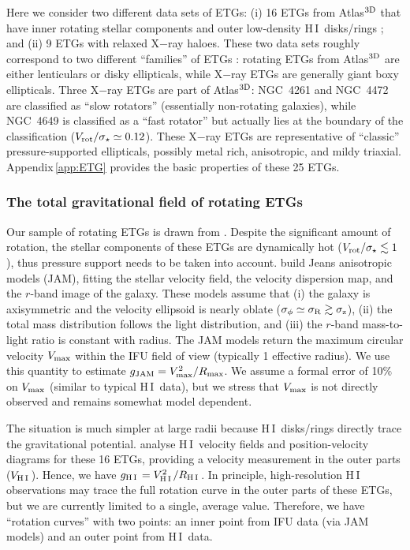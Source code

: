 \documentclass[apjl, twocolappendix]{emulateapj}
\newcommand{\hi } {{\rm H}\,{\small\rm I} \,}
\begin{document}
Here we consider two different data sets of ETGs: (i) 16 ETGs from Atlas$^{\rm 3D}$ \citep{Cappellari2011} that have inner rotating stellar components \citep{Emsellem2011} and outer low-density \hi disks/rings \citep{denHeijer2015}; and (ii) 9 ETGs with relaxed X$-$ray haloes. These two data sets roughly correspond to two different ``families'' of ETGs \citep[e.g.,][]{Kormendy1996, Kormendy2009, Cappellari2016}: rotating ETGs from Atlas$^{\rm 3D}$ are either lenticulars or disky ellipticals, while X$-$ray ETGs are generally giant boxy ellipticals. Three X$-$ray ETGs are part of Atlas$^{\rm 3D}$: NGC~4261 and NGC~4472 are classified as ``slow rotators'' (essentially non-rotating galaxies), while NGC~4649 is classified as a ``fast rotator'' but actually lies at the boundary of the classification ($V_{\rm rot}/\sigma_{\star}\simeq 0.12$). These X$-$ray ETGs are representative of ``classic'' pressure-supported ellipticals, possibly metal rich, anisotropic, and mildy triaxial. Appendix\,\ref{app:ETG} provides the basic properties of these 25 ETGs.

\subsubsection{The total gravitational field of rotating ETGs}\label{sec:rotETGs}

Our sample of rotating ETGs is drawn from \citet{Serra2016}. Despite the significant amount of rotation, the stellar components of these ETGs are dynamically hot ($V_{\rm rot}/\sigma_{\star} \lesssim 1$), thus pressure support needs to be taken into account. \citet{Cappellari2013} build Jeans anisotropic models (JAM), fitting the stellar velocity field, the velocity dispersion map, and the $r$-band image of the galaxy. These models assume that (i) the galaxy is axisymmetric and the velocity ellipsoid is nearly oblate ($\sigma_{\phi}\simeq\sigma_{\rm R}\gtrsim\sigma_{\rm z}$), (ii) the total mass distribution follows the light distribution, and (iii) the $r$-band mass-to-light ratio is constant with radius. The JAM models return the maximum circular velocity $V_{\rm max}$ within the IFU field of view (typically 1 effective radius). We use this quantity to estimate $g_{\rm JAM} = V_{\rm max}^2/R_{\rm max}$. We assume a formal error of 10$\%$ on $V_{\rm max}$ (similar to typical \hi data), but we stress that $V_{\rm max}$ is not directly observed and remains somewhat model dependent.

The situation is much simpler at large radii because \hi disks/rings directly trace the gravitational potential. \citet{denHeijer2015} analyse \hi velocity fields and position-velocity diagrams for these 16 ETGs, providing a velocity measurement in the outer parts ($V_{\hi}$). Hence, we have $g_{\rm \hi} = V_{\hi}^2/R_{\hi}$. In principle, high-resolution \hi observations may trace the full rotation curve in the outer parts of these ETGs, but we are currently limited to a single, average value. Therefore, we have ``rotation curves'' with two points: an inner point from IFU data (via JAM models) and an outer point from \hi data.
\end{document}
